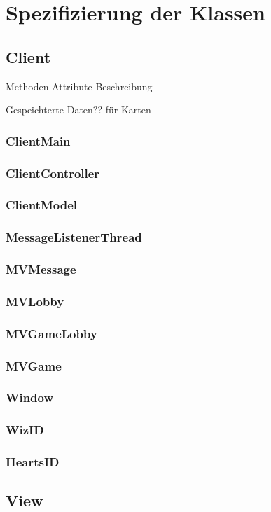 \documentclass{article}
\begin{document}
\section{Spezifizierung der Klassen}
\subsection{Client}
Methoden
Attribute
Beschreibung

Gespeichterte Daten?? für Karten
\subsubsection{ClientMain}
\subsubsection{ClientController}
\subsubsection{ClientModel}
\subsubsection{MessageListenerThread}
\subsubsection{MVMessage}
\subsubsection{MVLobby}
\subsubsection{MVGameLobby}
\subsubsection{MVGame}
\subsubsection{Window}
\subsubsection{WizID}
\subsubsection{HeartsID}
\newpage

\subsection{View}
\end{document}
